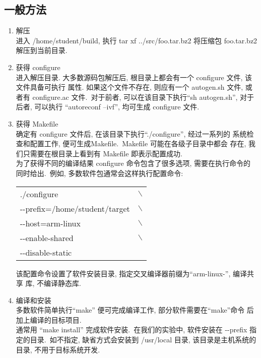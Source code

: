 \subsection{一般方法}
\begin{enumerate}
  \item 解压\\
      进入 /home/student/build, 执行 tar xf ../src/foo.tar.bz2 将压缩包
      foo.tar.bz2 解压到当前目录.
  \item 获得 configure\\
      进入解压目录.
      大多数源码包解压后, 根目录上都会有一个 configure 文件, 该文件具备可执行
      属性. 如果这个文件不存在, 则应有一个 autogen.sh 文件, 或者有
      configure.ac 文件.~对于前者, 可以在该目录下执行``sh autogen.sh'',
      对于后者, 可以执行 ``autoreconf --ivf'', 均可生成 configure 文件.
  \item 获得 Makefile\\
      确定有 configure 文件后, 在该目录下执行``./configure'', 经过一系列的
      系统检查和配置工作, 便可生成Makefile.~Makefile 可能在各级子目录中都会
      存在, 我们只需要在根目录上看到有 Makefile 即表示配置成功.\\
      为了获得不同的编译结果 configure 命令包含了很多选项, 需要在执行命令的
      同时给出.~例如, 多数软件包通常会这样执行配置命令:

    \begin{boxedminipage}{.8\textwidth}
        \begin{tabular}{ll}
            ./configure           &$\backslash$\\
            \qquad -{}-prefix=/home/student/target &$\backslash$\\
            \qquad -{}-host=arm-linux      &$\backslash$\\
            \qquad -{}-enable-shared       &$\backslash$\\
            \qquad -{}-disable-static      &
        \end{tabular}
    \end{boxedminipage}

    该配置命令设置了软件安装目录, 指定交叉编译器前缀为``arm-linux-'', 编译共享
库, 不编译静态库.

  \item 编译和安装\\
      多数软件简单执行``make'' 便可完成编译工作, 部分软件需要在``make''命令
      后加上编译的目标项目.\\
      通常用 ``make install'' 完成软件安装.~在我们的实验中, 软件安装在
      -{}-prefix 指定的目录.~如不指定, 缺省方式会安装到 /usr/local 目录, 
      该目录是主机系统的目录, 不用于目标系统开发.

\end{enumerate}

